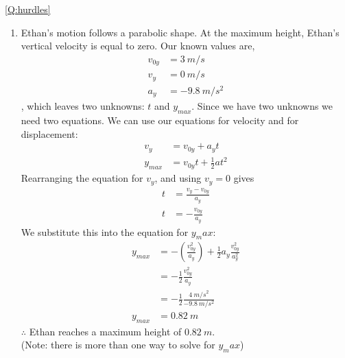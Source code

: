 \begin{solution}{\ref{Q:hurdles}}
{\begin{enumerate}[label=\alph*)]
First, rearrange the equation for $y$ and solve the quadratic:
\begin{align*}
0&=\frac{1}{2}a_yt^2+v_{0y}t-y\\
0&=\frac{1}{2}(\SI{-9.8}{m/s^2})t^2+(\SI{4}{m/s})t-\SI{0.5}{m}\\
t&=\SI{0.15}{s}, \SI{0.66}{s}
\end{align*}
We want to know when Ethan reaches $\SI{0.5}{m}$ for the first time, so $t=\SI{0.15}{s}$. All that's left is to find the horizontal displacement at this time:
\begin{align*}
x&=v_xt\\
&=(\SI{3}{m/s})(\SI{0.15}{s})\\
&=\SI{0.45}{m}
\end{align*}
$\therefore$ he can get as close as $\SI{0.45}{m}$ from the hurdle before he has to jump.
\item Ethan's motion follows a parabolic shape. At the maximum height, Ethan's vertical velocity is equal to zero. Our known values are,
\begin{align*}
v_{0y}&=\SI{3}{m/s}\\
v_y&=\SI{0}{m/s}\\
a_y&=\SI{-9.8}{m/s^2}
\end{align*}
, which leaves two unknowns: $t$ and $y_{max}$. Since we have two unknowns we need two equations. We can use our equations for velocity and for displacement:
\begin{align*}
v_y&=v_{0y}+a_yt\\
y_{max}&=v_{0y}t+\frac{1}{2}at^2
\end{align*}
Rearranging the equation for $v_y$, and using $v_y=0$ gives
\begin{align*}
t&=\frac{v_y-v_{0y}}{a_y}\\
t&=-\frac{v_{0y}}{a_y}
\end{align*}
We substitute this into the equation for $y_max$:
\begin{align*}
y_{max}&=-(\frac{v_{0y}^2}{a_y})+\frac{1}{2}a_y\frac{v_{0y}^2}{a_y^2}\\
&=-\frac{1}{2}\frac{v_{0y}^2}{a_y}\\
&=-\frac{1}{2}\frac{\SI{4}{m/s}^2}{\SI{-9.8}{m/s^2}}\\
y_{max}&=\SI{0.82}{m}
\end{align*}
$\therefore$ Ethan reaches a maximum height of $\SI{0.82}{m}$. \\

(Note: there is more than one way to solve for $y_max$)
\end{enumerate}}
\end{solution}


